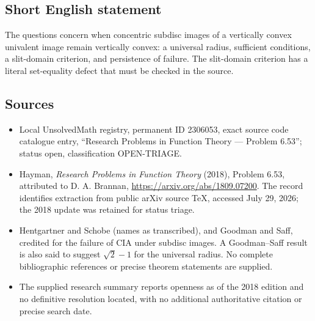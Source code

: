 \documentclass[11pt]{article}
\begin{document}
\subsection{Short English statement}
The questions concern when concentric subdisc images of a vertically convex univalent image remain vertically convex: a universal radius, sufficient conditions, a slit-domain criterion, and persistence of failure. The slit-domain criterion has a literal set-equality defect that must be checked in the source.
\subsection{Sources}
\begin{itemize}
\item Local UnsolvedMath registry, permanent ID 2306053, exact source code catalogue entry, ``Research Problems in Function Theory --- Problem 6.53''; status open, classification OPEN-TRIAGE.
\item Hayman, \emph{Research Problems in Function Theory} (2018), Problem 6.53, attributed to D. A. Brannan, \url{https://arxiv.org/abs/1809.07200}. The record identifies extraction from public arXiv source TeX, accessed July 29, 2026; the 2018 update was retained for status triage.
\item Hentgartner and Schobe (names as transcribed), and Goodman and Saff, credited for the failure of CIA under subdisc images. A Goodman--Saff result is also said to suggest $\sqrt2-1$ for the universal radius. No complete bibliographic references or precise theorem statements are supplied.
\item The supplied research summary reports openness as of the 2018 edition and no definitive resolution located, with no additional authoritative citation or precise search date.
\end{itemize}
\end{document}
